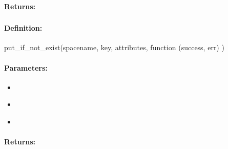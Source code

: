 \paragraph{Returns:}


\pagebreak
\subsubsection{}
\label{api:nodejs:put_if_not_exist}


\paragraph{Definition:}
\begin{javascriptcode}
put_if_not_exist(spacename, key, attributes, function (success, err) {})
\end{javascriptcode}
\paragraph{Parameters:}
\begin{itemize}[noitemsep]
\item {}\\

\item {}\\

\item {}\\

\end{itemize}

\paragraph{Returns:}


\pagebreak
\subsubsection{}
\label{api:nodejs:del}


